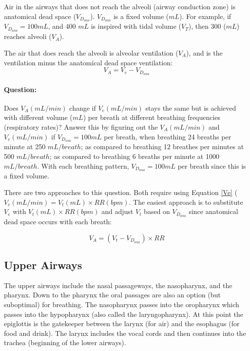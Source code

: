 Air in the airways that does not reach the alveoli (airway conduction zone) is anatomical dead space ($V_D_{ana}$). $V_D_{ana}$ is a fixed volume ($mL$). For example, if $V_D_{ana} = 100 mL$, and 400 $mL$ is inspired with tidal volume ($V_T$), then 300 ($mL$) reaches alveoli ($V_A$). 

The air that does reach the alveoli is alveolar ventilation ($V_A$), and is the ventilation minus the anatomical dead space ventilation:
\vspace{2mm}
\begin{equation}
    V_A = V_e - V_D_{ana}
    \label{eq:Va}
\end{equation}
\vspace{2mm}

\paragraph{Question:}

Does $V_A (mL/min)$ change if $V_e (mL/min)$ stays the same but is achieved with different volume ($mL$) per breath at different breathing frequencies (respiratory rates)? Answer this by figuring out the $V_A (mL/min)$ and $V_e (mL/min)$ if $V_D_{ana} = 100 mL$ per breath, when breathing 24 breaths per minute at 250 $mL/breath$; as compared to breathing 12 breathes per minutes at 500 $mL/breath$; as compared to breathing 6 breaths per minute at 1000 $mL/breath$. With each breathing pattern, $V_D_{ana} = 100 mL$ per breath since this is a fixed volume.

There are two approaches to this question. Both require using Equation \ref{Ve} ($V_e (mL/min) = V_t (mL) \times RR (bpm)$. The easiest approach is to substitute $V_e$ with $V_t (mL) \times RR (bpm)$ and adjust $V_t$ based on $V_D_{ana}$ since anatomical dead space occurs with each breath:

\begin{equation}
    V_A = (V_t - V_D_{ana}) \times RR
\end{equation}

\subsection{Upper Airways}

The upper airways include the nasal passageways, the nasopharynx, and the pharynx. Down to the pharynx the oral passages are also an option (but suboptimal) for breathing. The nasopharynx passes into the oropharynx which passes into the hypopharynx (also called the laryngopharynx). At this point the epiglottis is the gatekeeper between the larynx (for air) and the esophagus (for food and drink).  The larynx includes the vocal cords and then continues into the trachea (beginning of the lower airways). 

